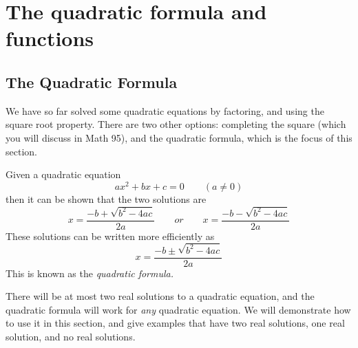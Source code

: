 \chapter{The quadratic formula and functions}
\minitoc
\section{The Quadratic Formula}
%
We have so far solved some \gls{quadratic} equations by factoring, and using the square root property. There
are two other options: completing the square (which you will discuss in Math 95), and the quadratic
formula, which is the focus of this section.

\begin{myDefinition}
	Given a quadratic \gls{equation}
	\[
		ax^2 + bx + c = 0 \qquad (a\ne 0)
	\]
	then it can be shown that the two solutions are
	\[
		x = \frac{-b+\sqrt{b^2-4ac}}{2a} \qquad or \qquad x = \frac{-b-\sqrt{b^2-4ac}}{2a}
	\]
	These solutions can be written more efficiently as
	\[
		x = \frac{-b\pm \sqrt{b^2-4ac}}{2a}
	\]
	This is known as the {\em quadratic formula.}
\end{myDefinition} 

There will be at most two real solutions to a quadratic equation, and the quadratic formula will work for {\em any} quadratic
equation. We will demonstrate how to use it in this section, and give examples that have two real solutions, one real \gls{solution}, 
and no real solutions.

